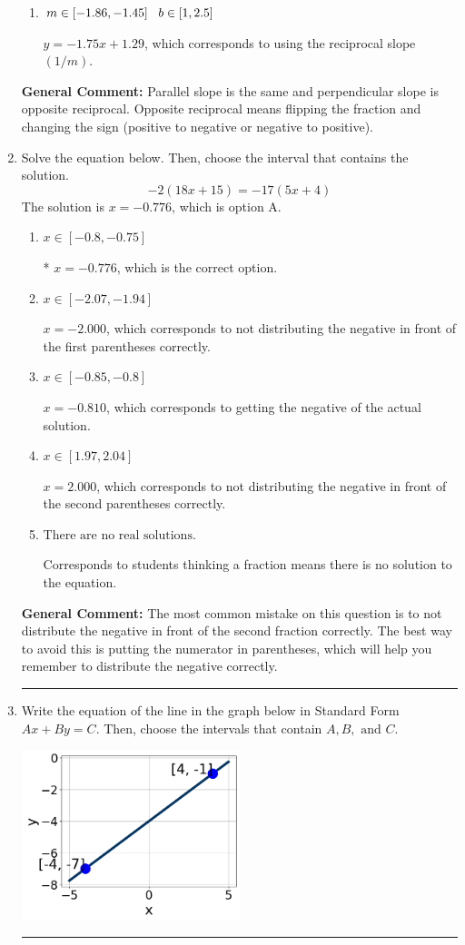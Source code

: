 \documentclass{extbook}[14pt]
\newcommand{\litem}[1]{\item #1

\rule{\textwidth}{0.4pt}}
\begin{document}
\begin{enumerate}
{\begin{enumerate}[label=\Alph*.]
* $y = -0.57x + 1.29$, which is the correct option.
\item \( m \in [-1.86, -1.45] \hspace*{3mm} b \in [1, 2.5] \)

 $y = -1.75x + 1.29$, which corresponds to using the reciprocal slope $(1/m)$.
\end{enumerate}

\textbf{General Comment:} Parallel slope is the same and perpendicular slope is opposite reciprocal. Opposite reciprocal means flipping the fraction and changing the sign (positive to negative or negative to positive).
}
\litem{
Solve the equation below. Then, choose the interval that contains the solution.
\[ -2(18x + 15) = -17(5x + 4) \]The solution is \( x = -0.776 \), which is option A.\begin{enumerate}[label=\Alph*.]
\item \( x \in [-0.8, -0.75] \)

* $x = -0.776$, which is the correct option.
\item \( x \in [-2.07, -1.94] \)

$x = -2.000$, which corresponds to not distributing the negative in front of the first parentheses correctly.
\item \( x \in [-0.85, -0.8] \)

$x = -0.810$, which corresponds to getting the negative of the actual solution.
\item \( x \in [1.97, 2.04] \)

$x = 2.000$, which corresponds to not distributing the negative in front of the second parentheses correctly.
\item \( \text{There are no real solutions.} \)

Corresponds to students thinking a fraction means there is no solution to the equation.
\end{enumerate}

\textbf{General Comment:} The most common mistake on this question is to not distribute the negative in front of the second fraction correctly. The best way to avoid this is putting the numerator in parentheses, which will help you remember to distribute the negative correctly.
}
\litem{
Write the equation of the line in the graph below in Standard Form $Ax+By=C$. Then, choose the intervals that contain $A, B, \text{ and } C$.

\begin{center}
    \includegraphics[width=0.5\textwidth]{../Figures/linearGraphToStandardCopyB.png}
\end{center}


}
\end{enumerate}
\end{document}

